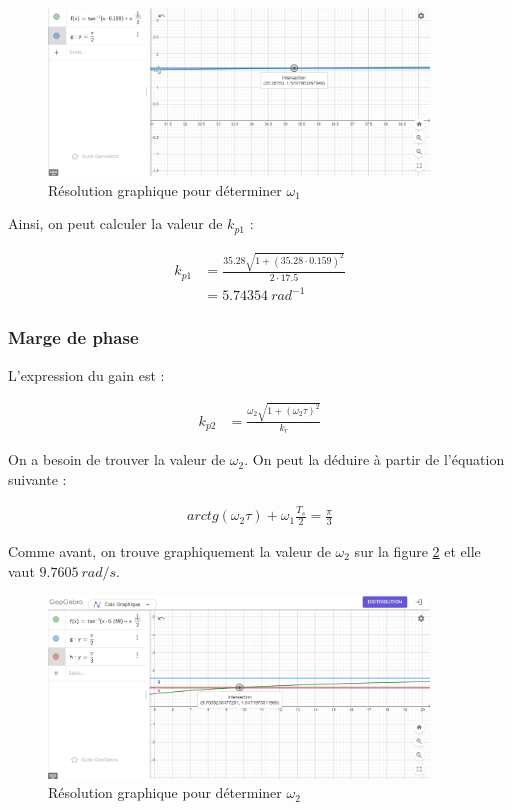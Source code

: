 \begin{figure}[H]
    \centering
    \includegraphics[width=0.9\textwidth]{Pictures/omega_1_marge_gain.png}
    \caption{Résolution graphique pour déterminer $\omega_1$}
    \label{fig:omega1}
\end{figure}

Ainsi, on peut calculer la valeur de $k_{p1}$ :

\begin{align*}
     k_{p1} &= \frac{35.28 \sqrt{1 +(35.28 \cdot 0.159)^2 }}{2 \cdot 17.5} \\
     &= 5.74354 \ rad^{-1}
\end{align*}

\subsubsection{Marge de phase}

L'expression du gain est : 

\begin{align*}
    k_{p2} &= \frac{\omega_2 \sqrt{1 +(\omega_2 \tau)^2 }}{ k_r}
\end{align*}

On a besoin de trouver la valeur de $\omega_2$. On peut la déduire à partir de l'équation suivante :

\begin{align*}
    arctg(\omega_2 \tau)+ \omega_1 \frac{T_s }{2}=\frac{\pi}{3} 
\end{align*}

Comme avant, on trouve graphiquement la valeur de $\omega_2$ sur la figure \ref{fig:omega2} et elle vaut $9.7605 \ rad/s$.

\begin{figure}[H]
    \centering
    \includegraphics[width=0.9\textwidth]{Pictures/omega_2_marge_phase.png}
    \caption{Résolution graphique pour déterminer $\omega_2$}
    \label{fig:omega2}
\end{figure}

